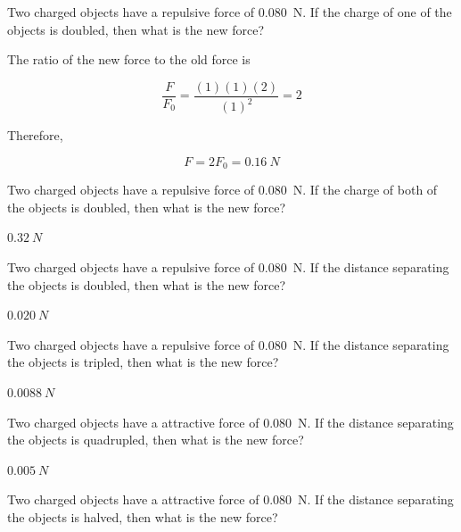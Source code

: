 \documentclass[]{exam}
\begin{document}
\begin{questions}

\question
Two charged objects have a repulsive force of \SI{0.080}{N}. If the charge of one of the objects is doubled, then what is the new force?

\begin{solution}
The ratio of the new force to the old force is

\begin{equation*}
    \frac{F}{F_0} = \frac{(1)(1)(2)}{(1)^2} = 2
\end{equation*}

Therefore,

\begin{equation*}
    F = 2F_0 = \boxed{\SI{0.16}{N}}
\end{equation*}

\end{solution}



\question
Two charged objects have a repulsive force of \SI{0.080}{N}. If the charge of both of the objects is doubled, then what is the new force?

\begin{solution}
$\SI{0.32}{N}$
\end{solution}

\question
Two charged objects have a repulsive force of \SI{0.080}{N}. If the distance separating the objects is doubled, then what is the new force?

\begin{solution}
$\SI{0.020}{N}$
\end{solution}

\question
Two charged objects have a repulsive force of \SI{0.080}{N}. If the distance separating the objects is tripled, then what is the new force?

\begin{solution}
$\SI{0.0088}{N}$
\end{solution}


\question
Two charged objects have a attractive force of \SI{0.080}{N}. If the distance separating the objects is quadrupled, then what is the new force?

\begin{solution}
$\SI{0.005}{N}$
\end{solution}

\question
Two charged objects have a attractive force of \SI{0.080}{N}. If the distance separating the objects is halved, then what is the new force?


\end{questions}
\end{document}
